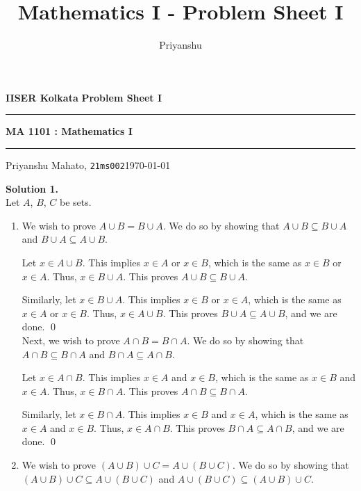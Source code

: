\documentclass[10pt]{article}
\title{Mathematics I - Problem Sheet I}
\author{Priyanshu}
\date{}
\begin{document}
	\par\textbf{IISER Kolkata} \hfill \textbf{Problem Sheet I}
	\vspace{3pt}
	\hrule
	\vspace{3pt}
	\begin{center}
		\LARGE{\textbf{MA 1101 : Mathematics I}}
	\end{center}
	\vspace{3pt}
	\hrule
	\vspace{3pt}
	Priyanshu Mahato, \texttt{21ms002}\hfill\today
	\vspace{20pt}
	
	\textbf{Solution 1.}\\
	Let $A$, $B$, $C$ be sets.
	\begin{enumerate}
		\item
		We wish to prove $A \cup B = B \cup A$. We do so by showing that $A \cup B \subseteq B \cup A$ and
		$B \cup A \subseteq A \cup B$.
		
		Let $x \in A \cup B$. This implies $x \in A$ or $x \in B$, which is the same as $x \in B$ or $x \in A$.
		Thus, $x \in B \cup A$. This proves $A \cup B \subseteq B \cup A$.
		
		Similarly, let $x \in B \cup A$. This implies $x \in B$ or $x \in A$, which is the same as $x \in A$ or $x \in B$.
		Thus, $x \in A \cup B$. This proves $B \cup A \subseteq A \cup B$, and we are done. \qed \\
		
		Next, we wish to prove $A \cap B = B \cap A$. We do so by showing that $A \cap B \subseteq B \cap A$ and
		$B \cap A \subseteq A \cap B$.
		
		Let $x \in A \cap B$. This implies $x \in A$ and $x \in B$, which is the same as $x \in B$ and $x \in A$.
		Thus, $x \in B \cap A$. This proves $A \cap B \subseteq B \cap A$.
		
		Similarly, let $x \in B \cap A$. This implies $x \in B$ and $x \in A$, which is the same as $x \in A$ and $x \in B$.
		Thus, $x \in A \cap B$. This proves $B \cap A \subseteq A \cap B$, and we are done. \qed
		
		
		\item
		We wish to prove $(A \cup B) \cup C = A \cup (B \cup C)$. We do so by showing that $(A \cup B) \cup C \subseteq A \cup (B \cup C)$
		and $A \cup (B \cup C) \subseteq (A \cup B) \cup C$.
		

\end{enumerate}
\end{document}

